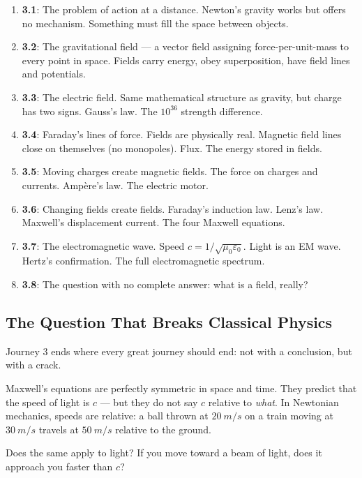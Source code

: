 \documentclass[12pt, a4paper, twoside]{book}
\newcounter{problem}[chapter]
\theoremstyle{disc}
\begin{document}
\begin{enumerate}[leftmargin=2em, itemsep=4pt]
  \item \textbf{3.1}: The problem of action at a distance. Newton's gravity works but offers no mechanism. Something must fill the space between objects.
  \item \textbf{3.2}: The gravitational field --- a vector field assigning force-per-unit-mass to every point in space. Fields carry energy, obey superposition, have field lines and potentials.
  \item \textbf{3.3}: The electric field. Same mathematical structure as gravity, but charge has two signs. Gauss's law. The $10^{36}$ strength difference.
  \item \textbf{3.4}: Faraday's lines of force. Fields are physically real. Magnetic field lines close on themselves (no monopoles). Flux. The energy stored in fields.
  \item \textbf{3.5}: Moving charges create magnetic fields. The force on charges and currents. Amp\`ere's law. The electric motor.
  \item \textbf{3.6}: Changing fields create fields. Faraday's induction law. Lenz's law. Maxwell's displacement current. The four Maxwell equations.
  \item \textbf{3.7}: The electromagnetic wave. Speed $c = 1/\sqrt{\mu_0\varepsilon_0}$. Light is an EM wave. Hertz's confirmation. The full electromagnetic spectrum.
  \item \textbf{3.8}: The question with no complete answer: what is a field, really?
\end{enumerate}

\subsection{The Question That Breaks Classical Physics}

Journey 3 ends where every great journey should end: not with a conclusion, but with a crack.

Maxwell's equations are perfectly symmetric in space and time. They predict that the speed of light is $c$ --- but they do not say $c$ relative to \emph{what}. In Newtonian mechanics, speeds are relative: a ball thrown at $\SI{20}{m/s}$ on a train moving at $\SI{30}{m/s}$ travels at $\SI{50}{m/s}$ relative to the ground.

Does the same apply to light? If you move toward a beam of light, does it approach you faster than $c$?
\end{document}
